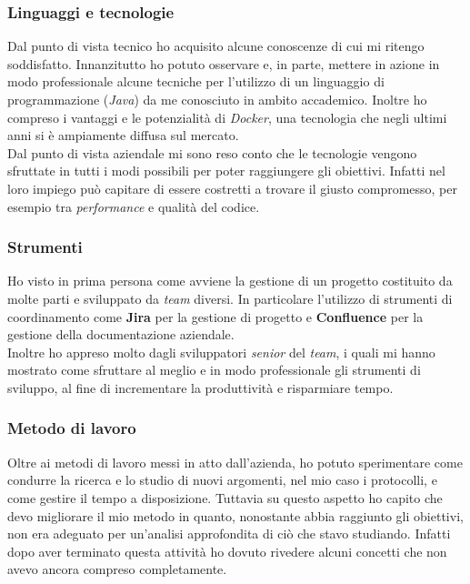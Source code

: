 \subsubsection{Linguaggi e tecnologie}
Dal punto di vista tecnico ho acquisito alcune conoscenze di cui mi ritengo soddisfatto. Innanzitutto ho potuto osservare e, in parte, mettere in azione in modo professionale alcune tecniche per l'utilizzo di un linguaggio di programmazione (\textit{Java}) da me conosciuto in ambito accademico.
Inoltre ho compreso i vantaggi e le potenzialità di \textit{Docker}, una tecnologia che negli ultimi anni si è ampiamente diffusa sul mercato. \\
Dal punto di vista aziendale mi sono reso conto che le tecnologie vengono sfruttate in tutti i modi possibili per poter raggiungere gli obiettivi. Infatti nel loro impiego può capitare di essere costretti a trovare il giusto compromesso, per esempio tra \textit{performance} e qualità del codice.

\subsubsection{Strumenti}
Ho visto in prima persona come avviene la gestione di un progetto costituito da molte parti e sviluppato da \textit{team} diversi. In particolare l'utilizzo di strumenti di coordinamento come \textbf{Jira} per la gestione di progetto e \textbf{Confluence} per la gestione della documentazione aziendale. \\
Inoltre ho appreso molto dagli sviluppatori \textit{senior} del \textit{team}, i quali mi hanno mostrato come sfruttare al meglio e in modo professionale gli strumenti di sviluppo, al fine di incrementare la produttività e risparmiare tempo.

\subsubsection{Metodo di lavoro}
Oltre ai metodi di lavoro messi in atto dall'azienda, ho potuto sperimentare come condurre la ricerca e lo studio di nuovi argomenti, nel mio caso i protocolli, e come gestire il tempo a disposizione. Tuttavia su questo aspetto ho capito che devo migliorare il mio metodo in quanto, nonostante abbia raggiunto gli obiettivi, non era adeguato per un'analisi approfondita di ciò che stavo studiando. Infatti dopo aver terminato questa attività ho dovuto rivedere alcuni concetti che non avevo ancora compreso completamente.
